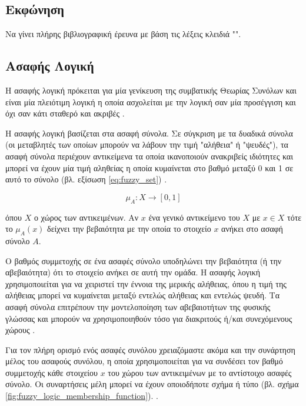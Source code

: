 \documentclass{assignment}
\begin{document}
\subsection{Εκφώνηση}

Να γίνει πλήρης βιβλιογραφική έρευνα με βάση τις λέξεις κλειδιά "".

\subsection {Ασαφής Λογική}

Η ασαφής λογική πρόκειται για μία γενίκευση της συμβατικής Θεωρίας Συνόλων και είναι μία πλειότιμη λογική η οποία ασχολείται με την λογική σαν μία προσέγγιση και όχι σαν κάτι σταθερό και ακριβές \cite{engelbrecht,class_notes,wiki:fuzzy_logic,zadeh1994}. %

Η ασαφής λογική βασίζεται στα ασαφή σύνολα. Σε σύγκριση με τα δυαδικά σύνολα (οι μεταβλητές των οποίων μπορούν να λάβουν την τιμή "αλήθεια" ή "ψευδές"), τα ασαφή σύνολα περιέχουν αντικείμενα τα οποία ικανοποιούν ανακριβείς ιδιότητες και μπορεί να έχουν μία τιμή αληθείας η οποία κυμαίνεται στο βαθμό μεταξύ 0 και 1 σε αυτό το σύνολο (βλ. εξίσωση \eqref{eq:fuzzy_set}) \cite{zadeh1965338}. 

\begin{equation}
\mu_A : X \rightarrow [0,1]
\label{eq:fuzzy_set}
\end{equation}

όπου $X$ ο χώρος των αντικειμένων. Αν $x$ ένα γενικό αντικείμενο του $X$ με $x \in X$ τότε το $\mu_A(x)$ δείχνει την βεβαιότητα με την οποία το στοιχείο $x$ ανήκει στο ασαφή σύνολο $A$.

Ο βαθμός συμμετοχής σε ένα ασαφές σύνολο υποδηλώνει την βεβαιότητα (ή την αβεβαιότητα) ότι το στοιχείο ανήκει σε αυτή την ομάδα. Η ασαφής λογική χρησιμοποιείται για να χειριστεί την έννοια της μερικής αλήθειας, όπου η τιμή της αλήθειας μπορεί να κυμαίνεται μεταξύ εντελώς αλήθειας και εντελώς ψευδή. Τα ασαφή σύνολα επιτρέπουν την μοντελοποίηση των αβεβαιοτήτων της φυσικής γλώσσας και μπορούν να χρησιμοποιηθούν τόσο για διακριτούς ή/και συνεχόμενους χώρους \cite{engelbrecht,class_notes,wiki:fuzzy_logic}. 

Για τον πλήρη ορισμό ενός ασαφές συνόλου χρειαζόμαστε ακόμα και την συνάρτηση μέλος του ασαφούς συνόλου, η οποία χρησιμοποιείται για να συνδέσει τον βαθμό συμμετοχής κάθε στοιχείου $x$ του χώρου των αντικειμένων με το αντίστοιχο ασαφές σύνολο. Οι συναρτήσεις μέλη μπορεί να έχουν οποιοδήποτε σχήμα ή τύπο (βλ. σχήμα \ref{fig:fuzzy_logic_membership_function}). \cite{engelbrecht}.
\end{document}
